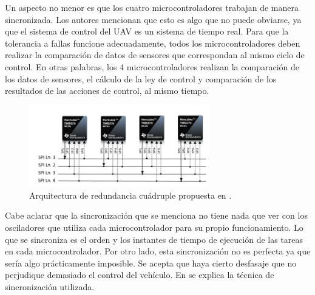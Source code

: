 Un aspecto no menor es que los cuatro microcontroladores trabajan de manera sincronizada. Los autores mencionan que esto es algo que no puede obviarse, ya que el sistema de control del UAV es un sistema de tiempo real. Para que la tolerancia a fallas funcione adecuadamente, todos los microcontroladores deben realizar la comparación de datos de sensores que correspondan al mismo ciclo de control. En otras palabras, los 4 microcontroladores realizan la comparación de los datos de sensores, el cálculo de la ley de control y comparación de los resultados de las acciones de control, al mismo tiempo. %

\begin{figure}[H]
    \centering
    \includegraphics[width=0.7\textwidth]{img/redundancy_SPI.png}
    \caption{Arquitectura de redundancia cuádruple propuesta en \cite{hiergeist2018implementation}.}
    \label{fig:redundancy_SPI}
\end{figure}


Cabe aclarar que la sincronización que se menciona no tiene nada que ver con los osciladores que utiliza cada microcontrolador para su propio funcionamiento. Lo que se sincroniza es el orden y los instantes de tiempo de ejecución de las tareas en cada microcontrolador. Por otro lado, esta sincronización no es perfecta ya que sería algo prácticamente imposible. Se acepta que haya cierto desfasaje que no perjudique demasiado el control del vehículo. En \cite{hiergeist2018implementation} se explica la técnica de sincronización utilizada.

